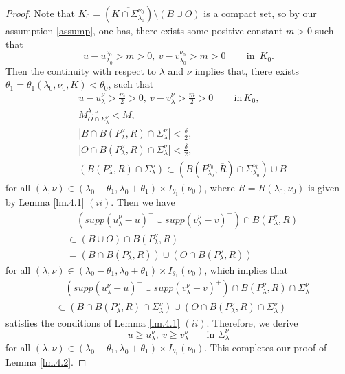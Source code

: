 \documentclass[10pt,a4paper]{amsart}
\begin{document}
\begin{proof}
Note that $K_0=(\overline{K\cap\Sigma_{\lambda_0}^{\nu_0}}) \setminus (B\cup O)$ is a compact set, so by our assumption \eqref{assump}, one has, there exists some positive constant $m>0$ such that
$$ u-u_{\lambda_0}^{\nu_0}>m>0,\  v-v_{\lambda_0}^{\nu_0}>m>0 \quad\quad \,\mbox{in}\,\,\, K_0. $$
Then the continuity with respect to $\lambda$ and $\nu$ implies that, there exists $\theta_1=\theta_1(\lambda_0,\nu_0,K)<\theta_0$, such that
\begin{align*}
& u-u^{\nu}_{\lambda}> \frac{m}{2}>0,\ v-v^{\nu}_{\lambda}> \frac{m}{2}>0 \qquad \,\mbox{in}\,K_0, \\
& M_{O\cap \Sigma_\lambda^\nu}^{\lambda,\nu}< M, \\
& |B\cap B(P_\lambda^\nu,R) \cap \Sigma_\lambda^\nu |< \frac{\delta}{2},\\
& |O\cap B(P_\lambda^\nu,R) \cap \Sigma_\lambda^\nu |< \frac{\delta}{2},\\
& (B(P_\lambda^\nu,R)\cap \Sigma_\lambda^\nu)\subset (B(P_{\lambda_0}^{\nu_0},\overline{R})\cap \Sigma_{\lambda_0}^{\nu_0}) \cup B
\end{align*}
for all $(\lambda,\nu)\in (\lambda_0-\theta_1, \lambda_0+\theta_1)\times I_{\theta_1}(\nu_0)$, where $R=R(\lambda_0,\nu_0)$ is given by Lemma \ref{lm.4.1} $(ii)$. Then we have
\begin{align*}
     & \quad(supp(u^{\nu}_{\lambda}-u)^+\cup supp(v^{\nu}_{\lambda}-v)^+) \cap B(P_\lambda^\nu,R)\\
     &\subset (B\cup O) \cap B(P_\lambda^\nu,R) \\
     &= (B\cap B(P_\lambda^\nu,R)) \cup (O\cap B(P_\lambda^\nu,R))
\end{align*}
for all $(\lambda,\nu)\in (\lambda_0-\theta_1, \lambda_0+\theta_1)\times I_{\theta_1}(\nu_0)$, which implies that
\begin{align*}
    & \quad(supp(u^{\nu}_{\lambda}-u)^+\cup supp(v^{\nu}_{\lambda}-v)^+) \cap B(P_\lambda^\nu,R)\cap \Sigma_\lambda^\nu\\
    &\subset(B\cap B(P_\lambda^\nu,R)\cap \Sigma_\lambda^\nu) \cup (O\cap B(P_\lambda^\nu,R)\cap \Sigma_\lambda^\nu)
\end{align*}
satisfies the conditions of Lemma \ref{lm.4.1} $(ii)$. Therefore, we derive
$$ u\geq u^{\nu}_{\lambda},\ v\geq v^{\nu}_{\lambda} \quad \,\,\,\,\,\mbox{in}\,\, \Sigma_\lambda^\nu$$
for all $(\lambda,\nu)\in (\lambda_0-\theta_1,\lambda_0+\theta_1)\times I_{\theta_1}(\nu_0)$. This completes our proof of Lemma \ref{lm.4.2}.
\end{proof}
\end{document}
